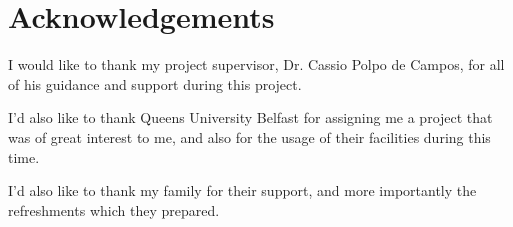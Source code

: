 \thispagestyle{empty}
\section*{Acknowledgements}

I would like to thank my project supervisor, Dr. Cassio Polpo de Campos, for all of his guidance
and support during this project.

I'd also like to thank Queens University Belfast for assigning me a project that was of great
interest to me, and also for the usage of their facilities during this time.

I'd also like to thank my family for their support, and more importantly the refreshments
which they prepared.